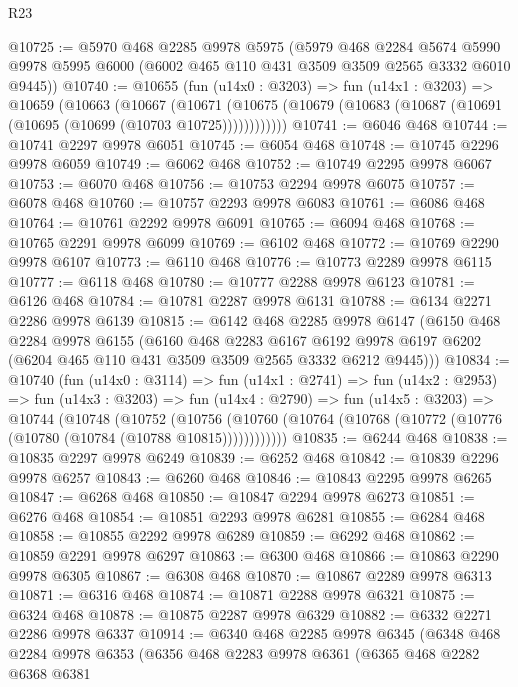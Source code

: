 \begin{lexlean}{R23}
\begin{coremodule}
@10725 := @5970
    @468
    @2285
    @9978
    @5975
    (@5979
      @468
      @2284
      @5674
      @5990
      @9978
      @5995
      @6000
      (@6002 @465 @110 @431 @3509 @3509 @2565 @3332 @6010 @9445))
@10740 := @10655
    (fun (u14x0 : @3203) =>
    fun (u14x1 : @3203) =>
    @10659
      (@10663
        (@10667
          (@10671 (@10675 (@10679 (@10683 (@10687 (@10691 (@10695 (@10699 (@10703 @10725))))))))))))
@10741 := @6046 @468
@10744 := @10741 @2297 @9978 @6051
@10745 := @6054 @468
@10748 := @10745 @2296 @9978 @6059
@10749 := @6062 @468
@10752 := @10749 @2295 @9978 @6067
@10753 := @6070 @468
@10756 := @10753 @2294 @9978 @6075
@10757 := @6078 @468
@10760 := @10757 @2293 @9978 @6083
@10761 := @6086 @468
@10764 := @10761 @2292 @9978 @6091
@10765 := @6094 @468
@10768 := @10765 @2291 @9978 @6099
@10769 := @6102 @468
@10772 := @10769 @2290 @9978 @6107
@10773 := @6110 @468
@10776 := @10773 @2289 @9978 @6115
@10777 := @6118 @468
@10780 := @10777 @2288 @9978 @6123
@10781 := @6126 @468
@10784 := @10781 @2287 @9978 @6131
@10788 := @6134 @2271 @2286 @9978 @6139
@10815 := @6142
    @468
    @2285
    @9978
    @6147
    (@6150
      @468
      @2284
      @9978
      @6155
      (@6160
        @468
        @2283
        @6167
        @6192
        @9978
        @6197
        @6202
        (@6204 @465 @110 @431 @3509 @3509 @2565 @3332 @6212 @9445)))
@10834 := @10740
    (fun (u14x0 : @3114) =>
    fun (u14x1 : @2741) =>
    fun (u14x2 : @2953) =>
    fun (u14x3 : @3203) =>
    fun (u14x4 : @2790) =>
    fun (u14x5 : @3203) =>
    @10744
      (@10748
        (@10752
          (@10756 (@10760 (@10764 (@10768 (@10772 (@10776 (@10780 (@10784 (@10788 @10815))))))))))))
@10835 := @6244 @468
@10838 := @10835 @2297 @9978 @6249
@10839 := @6252 @468
@10842 := @10839 @2296 @9978 @6257
@10843 := @6260 @468
@10846 := @10843 @2295 @9978 @6265
@10847 := @6268 @468
@10850 := @10847 @2294 @9978 @6273
@10851 := @6276 @468
@10854 := @10851 @2293 @9978 @6281
@10855 := @6284 @468
@10858 := @10855 @2292 @9978 @6289
@10859 := @6292 @468
@10862 := @10859 @2291 @9978 @6297
@10863 := @6300 @468
@10866 := @10863 @2290 @9978 @6305
@10867 := @6308 @468
@10870 := @10867 @2289 @9978 @6313
@10871 := @6316 @468
@10874 := @10871 @2288 @9978 @6321
@10875 := @6324 @468
@10878 := @10875 @2287 @9978 @6329
@10882 := @6332 @2271 @2286 @9978 @6337
@10914 := @6340
    @468
    @2285
    @9978
    @6345
    (@6348
      @468
      @2284
      @9978
      @6353
      (@6356
        @468
        @2283
        @9978
        @6361
        (@6365
          @468
          @2282
          @6368
          @6381

\end{coremodule}
\end{lexlean}
